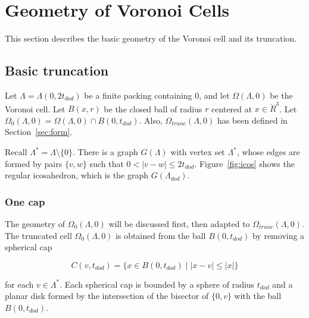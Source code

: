 \documentclass{article} %
\begin{document}
\section{Geometry of Voronoi Cells}

This section describes the basic geometry of the Voronoi cell and its
truncation.

\subsection{Basic truncation}
\label{sec:in-ex}

Let $\Lambda = \Lambda(0,2t_{dod})$ be a finite packing containing
$0$, and let $\Omega(\Lambda,0)$ be the Voronoi cell. Let $B(x,r)$ be
the closed ball of radius $r$ centered at $x\in\ring{R}^3$. Let
$\Omega_0(\Lambda,0) = \Omega(\Lambda,0)\cap B(0,t_{dod})$. Also,
$\Omega_{trunc}(\Lambda,0)$ has been defined in
Section~\ref{sec:form}.

Recall $\Lambda^* = \Lambda\setminus\{0\}$.  There is a graph $G(\Lambda)$
with vertex set $\Lambda^*$, whose edges are formed by pairs
$\{v,w\}$ such that $0<|v-w|\le 2t_{dod}$.  Figure~\ref{fig:icos}
shows the regular icosahedron, which is the graph $G(\Lambda_{dod})$.

\subsubsection{One cap}

The geometry of $\Omega_0(\Lambda,0)$ will be discussed first,
then adapted to $\Omega_{trunc}(\Lambda,0)$.  The truncated cell
$\Omega_0(\Lambda,0)$ is obtained from the ball $B(0,t_{dod})$ by
removing a spherical cap

$$
C(v,t_{dod}) = \{x \in B(0,t_{dod}) \mid  |x - v| \le |x| \}
$$

\noindent for each $v\in\Lambda^*$.
Each spherical cap is bounded by a sphere of radius $t_{dod}$ and
a planar disk formed by the intersection of the bisector of 
$\{0,v\}$ with the ball $B(0,t_{dod})$.
\end{document}
